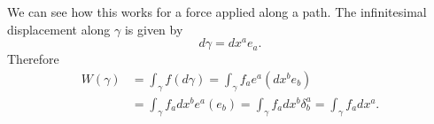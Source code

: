 \documentclass[fleqn,10pt]{wlscirep}
\begin{document}










We can see how this works for a force applied along a path. The infinitesimal displacement along $\gamma$ is given by
\begin{equation*}
	d\gamma = dx^a e_a.
\end{equation*}
Therefore 
\begin{equation*}
	\begin{aligned}
		W(\gamma) &= \int_\gamma f(d\gamma) = \int_\gamma  f_a e^a(dx^b e_b) \\
		&= \int_\gamma  f_a dx^b e^a( e_b)
		= \int_\gamma  f_a dx^b \delta^a_b
		= \int_\gamma  f_a dx^a.
	\end{aligned}
\end{equation*}
\end{document}
